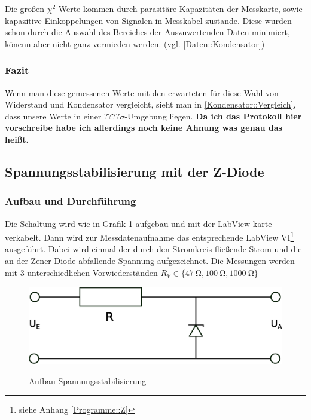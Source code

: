 \documentclass[12pt,twoside,a4paper]{scrartcl}
\begin{document}
				Die großen $\chi^2$-Werte kommen durch parasitäre Kapazitäten der Messkarte, sowie kapazitive Einkoppelungen von Signalen in Messkabel zustande.  Diese wurden schon durch die Auswahl des Bereiches der Auszuwertenden Daten minimiert, könenn aber nicht ganz vermieden werden. (vgl. \ref{Daten::Kondensator})

			\subsubsection{Fazit}
				Wenn man diese gemessenen Werte mit den erwarteten für diese Wahl von Widerstand und Kondensator vergleicht, sieht man in \ref{Kondensator::Vergleich}, dass unsere Werte in einer $???? \sigma$-Umgebung liegen. \textbf{Da ich das Protokoll hier vorschreibe habe ich allerdings noch keine Ahnung was genau das heißt.}

	\subsection{Spannungsstabilisierung mit der Z-Diode}

		\subsubsection{Aufbau und Durchführung}

			Die Schaltung wird wie in Grafik \ref{Aufbau::Z} aufgebau und mit der LabView karte verkabelt. Dann wird zur Messdatenaufnahme das entsprechende LabView VI\footnote{siehe Anhang \ref{Programme::Z}} ausgeführt. Dabei wird einmal der durch den Stromkreis fließende Strom und die an der Zener-Diode abfallende Spannung aufgezeichnet. Die Messungen werden mit 3 unterschiedlichen Vorwiederständen $R_V \in \{ \SI{47}{\ohm}, \SI{100}{\ohm}, \SI{1000}{\ohm} \}$

			\begin{figure}[H]
				\centering

				\includegraphics[width = 0.8 \textwidth]{Pictures/zener}
				\label{Aufbau::Z}
				\caption{Aufbau Spannungsstabilisierung}
			\end{figure}
\end{document}

